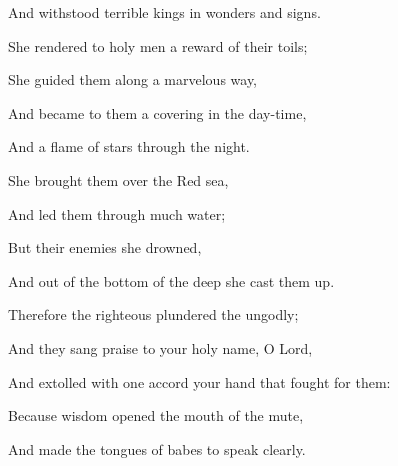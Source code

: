 {\par }{\QB And withstood terrible kings in wonders and signs.
\par }{\Q {}She rendered to holy men a reward of their toils;
\par }{\QB She guided them along a marvelous way,
\par }{\QB And became to them a covering in the day-time,
\par }{\QB And a flame of stars through the night.
\par }{\Q {}She brought them over the Red sea,
\par }{\QB And led them through much water;
\par }{\Q {}But their enemies she drowned,
\par }{\QB And out of the bottom of the deep she cast them up.
\par }{\Q {}Therefore the righteous plundered the ungodly;
\par }{\QB And they sang praise to your holy name, O Lord,
\par }{\QB And extolled with one accord your hand that fought for them:
\par }{\Q {}Because wisdom opened the mouth of the mute,
\par }{\Q And made the tongues of babes to speak clearly.
\par }{\BB \par }
